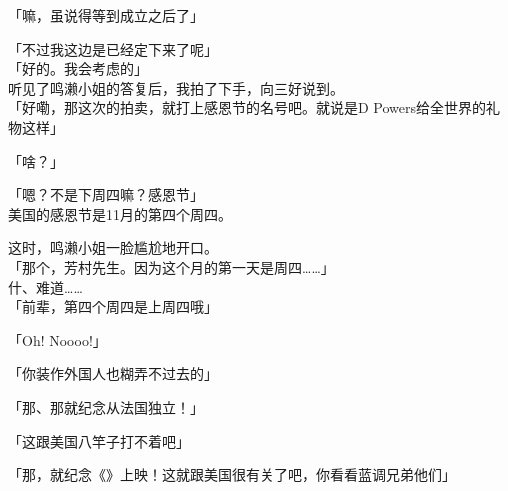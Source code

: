 「嘛，虽说得等到成立之后了」

「不过我这边是已经定下来了呢」\\

「好的。我会考虑的」\\

听见了鸣濑小姐的答复后，我拍了下手，向三好说到。\\

「好嘞，那这次的拍卖，就打上感恩节的名号吧。就说是D Powers给全世界的礼物这样」

「啥？」

「嗯？不是下周四嘛？感恩节」\\

美国的感恩节是11月的第四个周四。

这时，鸣濑小姐一脸尴尬地开口。\\

「那个，芳村先生。因为这个月的第一天是周四……」\\

什、难道……\\

「前辈，第四个周四是上周四哦」

「Oh! Noooo!」

「你装作外国人也糊弄不过去的」

「那、那就纪念从法国独立！」

「这跟美国八竿子打不着吧」

「那，就纪念《》上映！这就跟美国很有关了吧，你看看蓝调兄弟他们」

